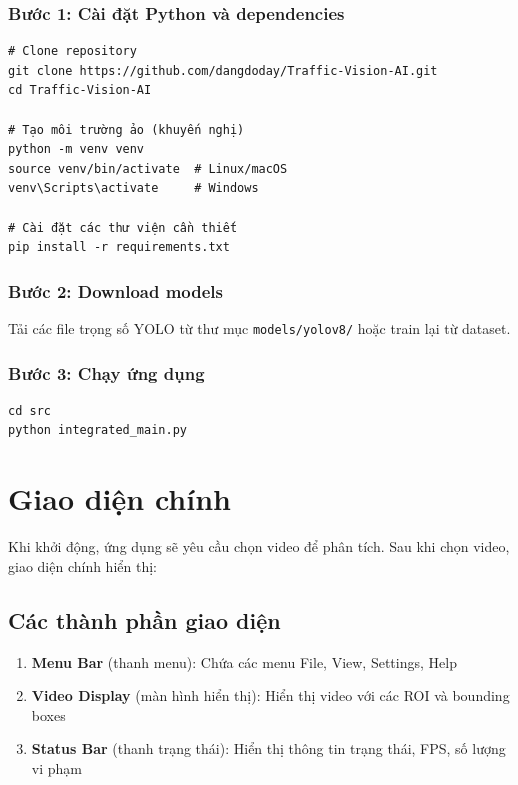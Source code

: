 \subsubsection{Bước 1: Cài đặt Python và dependencies}
\begin{verbatim}
# Clone repository
git clone https://github.com/dangdoday/Traffic-Vision-AI.git
cd Traffic-Vision-AI

# Tạo môi trường ảo (khuyến nghị)
python -m venv venv
source venv/bin/activate  # Linux/macOS
venv\Scripts\activate     # Windows

# Cài đặt các thư viện cần thiết
pip install -r requirements.txt
\end{verbatim}

\subsubsection{Bước 2: Download models}
Tải các file trọng số YOLO từ thư mục \texttt{models/yolov8/} hoặc train lại từ dataset.

\subsubsection{Bước 3: Chạy ứng dụng}
\begin{verbatim}
cd src
python integrated_main.py
\end{verbatim}

\section{Giao diện chính}

Khi khởi động, ứng dụng sẽ yêu cầu chọn video để phân tích. Sau khi chọn video, giao diện chính hiển thị:


\subsection{Các thành phần giao diện}

\begin{enumerate}
    \item \textbf{Menu Bar} (thanh menu): Chứa các menu File, View, Settings, Help
    \item \textbf{Video Display} (màn hình hiển thị): Hiển thị video với các ROI và bounding boxes
    \item \textbf{Status Bar} (thanh trạng thái): Hiển thị thông tin trạng thái, FPS, số lượng vi phạm
\end{enumerate}

